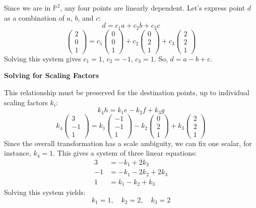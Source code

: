\documentclass[12pt]{article}
\begin{document}
    Since we are in $\mathbb{P}^2$, any four points are linearly dependent. Let's express point $d$ as a combination of $a$, $b$, and $c$:
    \[
    d = c_1 a + c_2 b + c_3 c
    \]
    \[
    \begin{pmatrix} 2 \\ 0 \\ 1 \end{pmatrix}
    = c_1 \begin{pmatrix} 0 \\ 0 \\ 1 \end{pmatrix}
    + c_2 \begin{pmatrix} 0 \\ 2 \\ 1 \end{pmatrix}
    + c_3 \begin{pmatrix} 2 \\ 2 \\ 1 \end{pmatrix}
    \]
    Solving this system gives $c_1 = 1$, $c_2 = -1$, $c_3 = 1$. So, $d = a - b + c$.

    \textbf{Solving for Scaling Factors}

    This relationship must be preserved for the destination points, up to individual scaling factors $k_i$:
    \[
    k_4 h = k_1 e - k_2 f + k_3 g
    \]
    \[
    k_4 \begin{pmatrix} 3 \\ -1 \\ 1 \end{pmatrix}
    = k_1 \begin{pmatrix} -1 \\ -1 \\ 1 \end{pmatrix}
    - k_2 \begin{pmatrix} 0 \\ 2 \\ 1 \end{pmatrix}
    + k_3 \begin{pmatrix} 2 \\ 2 \\ 1 \end{pmatrix}
    \]
    Since the overall transformation has a scale ambiguity, we can fix one scalar, for instance, $k_4 = 1$. This gives a system of three linear equations:
    \begin{align*}
        3 &= -k_1 + 2k_3 \\
        -1 &= -k_1 - 2k_2 + 2k_3 \\
        1 &= k_1 - k_2 + k_3
    \end{align*}
    Solving this system yields:
    \[
    k_1 = 1,\quad k_2 = 2,\quad k_3 = 2
    \]
\end{document}
